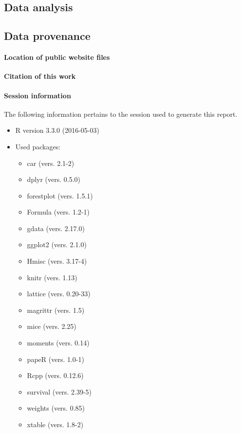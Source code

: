 \documentclass[fleqn,10pt]{SelfArx}\usepackage[]{graphicx}\usepackage[]{color}
\begin{document}
\subsection{Data analysis}
\lipsum[1]
\subsection{Data provenance}
\paragraph{Location of public website files} \lipsum[1] %
\paragraph{Citation of this work} \lipsum[1] %
\paragraph{Session information}
The following information pertains to the session used to generate this report.
\begin{itemize}\raggedright
  \item R version 3.3.0 (2016-05-03)
  \item Used packages: 
  \begin{itemize}
\item car (vers. 2.1-2) 
\item dplyr (vers. 0.5.0) 
\item forestplot (vers. 1.5.1) 
\item Formula (vers. 1.2-1) 
\item gdata (vers. 2.17.0) 
\item ggplot2 (vers. 2.1.0) 
\item Hmisc (vers. 3.17-4) 
\item knitr (vers. 1.13) 
\item lattice (vers. 0.20-33) 
\item magrittr (vers. 1.5) 
\item mice (vers. 2.25) 
\item moments (vers. 0.14) 
\item papeR (vers. 1.0-1) 
\item Rcpp (vers. 0.12.6) 
\item survival (vers. 2.39-5) 
\item weights (vers. 0.85) 
\item xtable (vers. 1.8-2) 
  \end{itemize}
\end{itemize}
\end{document}
